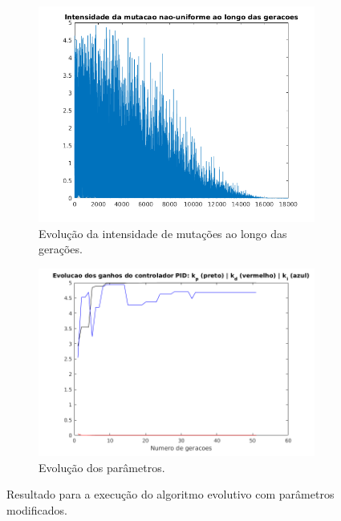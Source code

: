 \begin {enumerate}
\begin{figure}[h!]
		\begin{subfigure}{.5\textwidth}
		  \centering
		  \includegraphics[width=1\linewidth]{image/mutacao_pid_ex_c_mod}
		  \caption{\centering Evolução da intensidade de mutações ao longo das
		  gerações.}
		  \label{fig:pid_mutacao_c_mod}
		\end{subfigure}%
		\begin{subfigure}{.5\textwidth}
		  \centering
		  \includegraphics[width=1\linewidth]{image/kp_kd_ki_pid_ex_c_mod}
		  \caption{\centering Evolução dos parâmetros.}
		  \label{fig:pid_parametros_c_mod} 
		\end{subfigure}
	
	\caption{Resultado para a execução do algoritmo evolutivo com parâmetros
	modificados.}
	\end{figure}


\end{enumerate}
